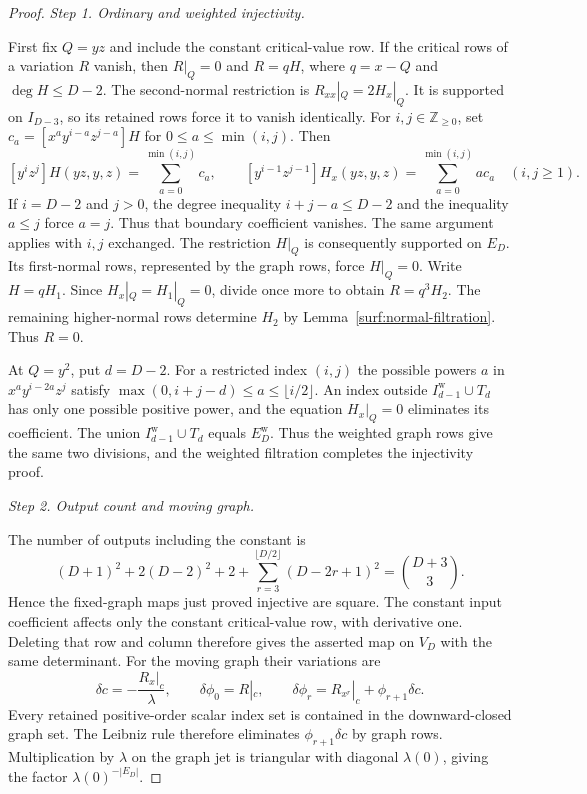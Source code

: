\documentclass[11pt]{amsart}
\theoremstyle{definition}
\theoremstyle{remark}
\numberwithin{equation}{section}
\begin{document}
\begin{proof}
\par\medskip\noindent\textit{Step 1. Ordinary and weighted injectivity.}\par\nobreak\smallskip
First fix $Q=yz$ and include the constant critical-value row. If the critical rows of a variation $R$ vanish, then $R|_Q=0$ and $R=qH$, where $q=x-Q$ and $\deg H\le D-2$. The second-normal restriction is $R_{xx}|_Q=2H_x|_Q$. It is supported on $I_{D-3}$, so its retained rows force it to vanish identically. For $i,j\in\mathbb{Z}_{\ge0}$, set $c_a=[x^ay^{i-a}z^{j-a}]H$ for $0\le a\le\min(i,j)$. Then
\[
[y^iz^j]H(yz,y,z)=\sum_{a=0}^{\min(i,j)}c_a,\qquad
[y^{i-1}z^{j-1}]H_x(yz,y,z)=\sum_{a=0}^{\min(i,j)}a c_a\quad(i,j\ge1).
\]
If $i=D-2$ and $j>0$, the degree inequality $i+j-a\le D-2$ and the inequality $a\le j$ force $a=j$. Thus that boundary coefficient vanishes. The same argument applies with $i,j$ exchanged. The restriction $H|_Q$ is consequently supported on $E_D$. Its first-normal rows, represented by the graph rows, force $H|_Q=0$. Write $H=qH_1$. Since $H_x|_Q=H_1|_Q=0$, divide once more to obtain $R=q^3H_2$. The remaining higher-normal rows determine $H_2$ by Lemma~\ref{surf:normal-filtration}. Thus $R=0$.

At $Q=y^2$, put $d=D-2$. For a restricted index $(i,j)$ the possible powers $a$ in $x^ay^{i-2a}z^j$ satisfy $\max(0,i+j-d)\le a\le\lfloor i/2\rfloor$. An index outside $I_{d-1}^{\mathrm w}\cup T_d$ has only one possible positive power, and the equation $H_x|_Q=0$ eliminates its coefficient. The union $I_{d-1}^{\mathrm w}\cup T_d$ equals $E_D^{\mathrm w}$. Thus the weighted graph rows give the same two divisions, and the weighted filtration completes the injectivity proof.

\par\medskip\noindent\textit{Step 2. Output count and moving graph.}\par\nobreak\smallskip
The number of outputs including the constant is
\[
 (D+1)^2+2(D-2)^2+2+\sum_{r=3}^{\lfloor D/2\rfloor}(D-2r+1)^2=\binom{D+3}{3}.
\]
Hence the fixed-graph maps just proved injective are square. The constant input coefficient affects only the constant critical-value row, with derivative one. Deleting that row and column therefore gives the asserted map on $V_D$ with the same determinant. For the moving graph their variations are
\[
 \delta c=-\frac{R_x|_c}{\lambda},\qquad \delta\phi_0=R|_c,\qquad \delta\phi_r=R_{x^r}|_c+\phi_{r+1}\delta c.
\]
Every retained positive-order scalar index set is contained in the downward-closed graph set. The Leibniz rule therefore eliminates $\phi_{r+1}\delta c$ by graph rows. Multiplication by $\lambda$ on the graph jet is triangular with diagonal $\lambda(0)$, giving the factor $\lambda(0)^{-|E_D|}$.


\end{proof}
\end{document}

